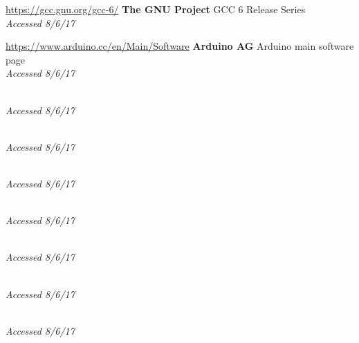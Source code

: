 \documentclass[a4paper]{article}
\begin{document}
\begin{thebibliography}{9}
\url{https://gcc.gnu.org/gcc-6/}
\textbf{The GNU Project}
GCC 6 Release Series
\\\textit{Accessed 8/6/17}

\url{https://www.arduino.cc/en/Main/Software}
\textbf{Arduino AG}
Arduino main software page
\\\textit{Accessed 8/6/17}

\url{}
\textbf{}
\\\textit{Accessed 8/6/17}

\url{}
\textbf{}
\\\textit{Accessed 8/6/17}

\url{}
\textbf{}
\\\textit{Accessed 8/6/17}


\url{}
\textbf{}
\\\textit{Accessed 8/6/17}

\url{}
\textbf{}
\\\textit{Accessed 8/6/17}


\url{}
\textbf{}
\\\textit{Accessed 8/6/17}

\bibitem{}
\url{}
\textbf{}
\\\textit{Accessed 8/6/17}


\bibitem{}
\url{}
\textbf{}



\bibitem{}
\url{}
\textbf{}
\\\textit{}

\end{thebibliography}
\end{document}
